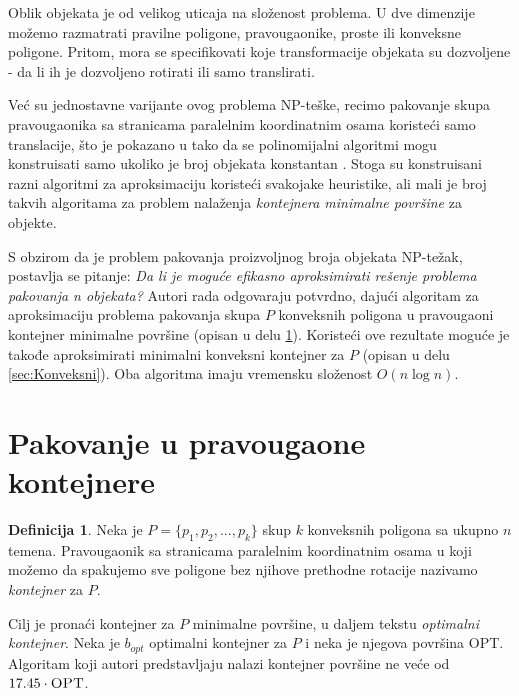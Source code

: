 \documentclass[a4paper]{article}
\theoremstyle{plain}
\theoremstyle{definition}
\newtheorem{defn}[thm]{Definicija}
\begin{document}
Oblik objekata je od velikog uticaja na slo\v{z}enost problema. U dve dimenzije mo\v{z}emo razmatrati pravilne poligone, pravougaonike, proste ili konveksne poligone. Pritom, mora se specifikovati koje transformacije objekata su dozvoljene - da li ih je dozvoljeno rotirati ili samo translirati. 

Ve\'c{} su jednostavne varijante ovog problema NP-te\v{s}ke, recimo pakovanje skupa pravougaonika sa stranicama paralelnim koordinatnim osama koriste\'c{}i samo translacije, \v{s}to je pokazano u \cite{OptimalPackingInPlane} tako da se polinomijalni algoritmi mogu konstruisati samo ukoliko je broj objekata konstantan \cite{BuildingThreeConvexPolygons, AligningTwoConvexFigures}. Stoga su konstruisani razni algoritmi za aproksimaciju koriste\'c{}i svakojake heuristike, ali mali je broj takvih algoritama za problem nala\v{z}enja \emph{kontejnera minimalne povr\v{s}ine} za objekte. 

S obzirom da je problem pakovanja proizvoljnog broja objekata NP-te\v{z}ak, postavlja se pitanje: \emph{Da li je mogu\'c{}e efikasno aproksimirati re\v{s}enje problema pakovanja n objekata?} Autori rada odgovaraju potvrdno, daju\'c{}i algoritam za aproksimaciju problema pakovanja skupa $P$ konveksnih poligona u pravougaoni kontejner minimalne povr\v{s}ine (opisan u delu \ref{sec:Pravougaoni}). Koriste\'c{}i ove rezultate mogu\'c{}e je takođe aproksimirati minimalni konveksni kontejner za $P$ (opisan u delu \ref{sec:Konveksni}). Oba algoritma imaju vremensku slo\v{z}enost $O(n\log{}n)$.


\section{Pakovanje u pravougaone kontejnere}
\label{sec:Pravougaoni}

\begin{defn}
    Neka je $P = \{ p_{1}, p_{2}, ... , p_{k} \}$ skup $k$ konveksnih poligona sa ukupno $n$ temena. Pravougaonik sa stranicama paralelnim koordinatnim osama u koji mo\v{z}emo da spakujemo sve poligone bez njihove prethodne rotacije nazivamo \emph{kontejner} za $P$.
\end{defn}

Cilj je prona\'c{}i kontejner za $P$ minimalne povr\v{s}ine, u daljem tekstu \emph{optimalni kontejner}. Neka je $b_{opt}$ optimalni kontejner za $P$ i neka je njegova povr\v{s}ina \textsc{OPT}. Algoritam koji autori predstavljaju nalazi kontejner povr\v{s}ine ne ve\'c{}e od $17.45 \cdot \textsc{OPT}$.
\end{document}
